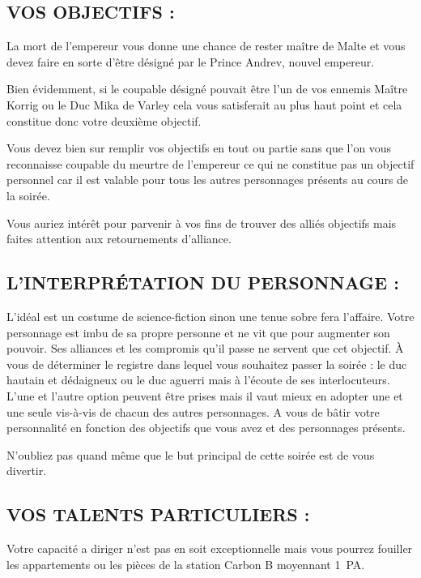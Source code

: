 \documentclass[14pt,twocolumn]{extarticle}
\begin{document}
\subsection{VOS OBJECTIFS :}

La mort de l'empereur vous donne une chance de rester maître de Malte et vous
devez faire en sorte d'être désigné par le Prince Andrev, nouvel empereur.

Bien évidemment, si le coupable désigné pouvait être l'un de vos ennemis Maître
Korrig ou le Duc Mika de Varley cela vous satisferait au plus haut point et
cela constitue donc votre deuxième objectif.

Vous devez bien sur remplir vos objectifs en tout ou partie sans que l'on vous
reconnaisse coupable du meurtre de l'empereur ce qui ne constitue pas un
objectif personnel car il est valable pour tous les autres personnages présents
au cours de la soirée.

Vous auriez intérêt pour parvenir à vos fins de trouver des alliés objectifs
mais faites attention aux retournements d'alliance.

\subsection{L'INTERPRÉTATION DU PERSONNAGE :}

L'idéal est un costume de science-fiction sinon une tenue sobre fera
l'affaire. Votre personnage est imbu de sa propre personne et ne vit que pour
augmenter son pouvoir. Ses alliances et les compromis qu'il passe ne servent
que cet objectif. À vous de déterminer le registre dans lequel vous souhaitez
passer la soirée : le duc hautain et dédaigneux ou le duc aguerri mais à
l'écoute de ses interlocuteurs. L'une et l'autre option peuvent être prises
mais il vaut mieux en adopter une et une seule vis-à-vis de chacun des autres
personnages. A vous de bâtir votre personnalité en fonction des objectifs que
vous avez et des personnages présents.

N'oubliez pas quand même que le but principal de cette soirée est de vous
divertir.

\subsection{VOS TALENTS PARTICULIERS :}

Votre capacité a diriger n'est pas en soit exceptionnelle mais vous pourrez
fouiller les appartements ou les pièces de la station Carbon B moyennant 1~PA.
\end{document}
